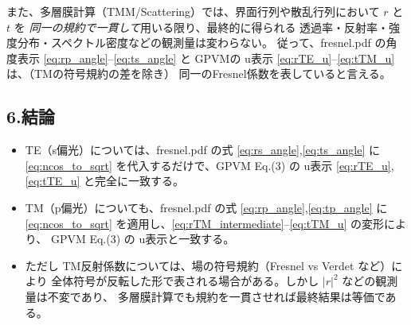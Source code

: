 また、多層膜計算（TMM/Scattering）では、界面行列や散乱行列において
$r$ と $t$ を \emph{同一の規約で一貫して}用いる限り、最終的に得られる
透過率・反射率・強度分布・スペクトル密度などの観測量は変わらない。
従って、fresnel.pdf の角度表示 \eqref{eq:rp_angle}--\eqref{eq:ts_angle} と
GPVMの u表示 \eqref{eq:rTE_u}--\eqref{eq:tTM_u} は、（TMの符号規約の差を除き）
同一のFresnel係数を表していると言える。

\subsection*{6.\;結論}
\begin{itemize}
\item TE（s偏光）については、fresnel.pdf の式 \eqref{eq:rs_angle},\eqref{eq:ts_angle} に
\eqref{eq:ncos_to_sqrt} を代入するだけで、GPVM Eq.(3) の u表示
\eqref{eq:rTE_u},\eqref{eq:tTE_u} と完全に一致する。
\item TM（p偏光）についても、fresnel.pdf の式 \eqref{eq:rp_angle},\eqref{eq:tp_angle} に
\eqref{eq:ncos_to_sqrt} を適用し、\eqref{eq:rTM_intermediate}--\eqref{eq:tTM_u} の変形により、
GPVM Eq.(3) の u表示と一致する。
\item ただし TM反射係数については、場の符号規約（Fresnel vs Verdet など）により
全体符号が反転した形で表される場合がある。しかし $|r|^2$ などの観測量は不変であり、
多層膜計算でも規約を一貫させれば最終結果は等価である。
\end{itemize}
